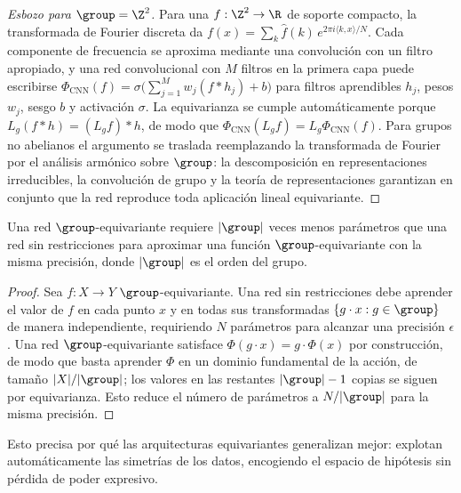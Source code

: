 \begin{proof}[Esbozo para $\group = \Z^2$]
Para una $f: \Z^2 \to \R$ de soporte compacto, la transformada de Fourier
discreta da $f(x) = \sum_{k} \hat f(k)\, e^{2\pi i \langle k, x\rangle / N}$.
Cada componente de frecuencia se aproxima mediante una convoluci\'on con un
filtro apropiado, y una red convolucional con $M$ filtros en la primera capa
puede escribirse $\Phi_{\text{CNN}}(f) = \sigma\big(\sum_{j=1}^M w_j (f * h_j) +
b\big)$ para filtros aprendibles $h_j$, pesos $w_j$, sesgo $b$ y activaci\'on
$\sigma$. La equivarianza se cumple autom\'aticamente porque $L_g(f * h) = (L_g
f) * h$, de modo que $\Phi_{\text{CNN}}(L_g f) = L_g \Phi_{\text{CNN}}(f)$. Para
grupos no abelianos el argumento se traslada reemplazando la transformada de
Fourier por el an\'alisis arm\'onico sobre $\group$: la descomposici\'on en
representaciones irreducibles, la convoluci\'on de grupo y la teor\'ia de
representaciones garantizan en conjunto que la red reproduce toda aplicaci\'on
lineal equivariante.
\end{proof}

\begin{corollary}
\label{cor:groups:parameter-efficiency}
Una red $\group$-equivariante requiere $|\group|$ veces menos par\'ametros que
una red sin restricciones para aproximar una funci\'on $\group$-equivariante con
la misma precisi\'on, donde $|\group|$ es el orden del grupo.
\end{corollary}

\begin{proof}
Sea $f: X \to Y$ $\group$-equivariante. Una red sin restricciones debe aprender
el valor de $f$ en cada punto $x$ y en todas sus transformadas $\{g \cdot x : g
\in \group\}$ de manera independiente, requiriendo $N$ par\'ametros para alcanzar
una precisi\'on $\epsilon$. Una red $\group$-equivariante satisface $\Phi(g \cdot
x) = g \cdot \Phi(x)$ por construcci\'on, de modo que basta aprender $\Phi$ en un
dominio fundamental de la acci\'on, de tama\~no $|X|/|\group|$; los valores en
las restantes $|\group| - 1$ copias se siguen por equivarianza. Esto reduce el
n\'umero de par\'ametros a $N/|\group|$ para la misma precisi\'on.
\end{proof}

Esto precisa por qu\'e las arquitecturas equivariantes generalizan mejor:
explotan autom\'aticamente las simetr\'ias de los datos, encogiendo el espacio de
hip\'otesis sin p\'erdida de poder expresivo.

